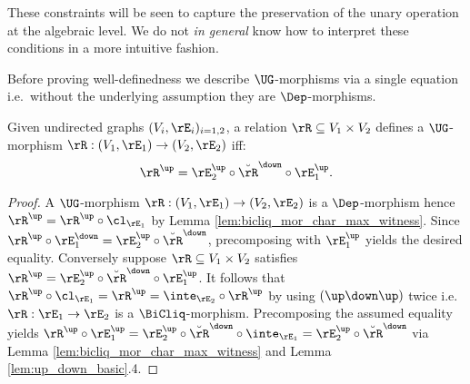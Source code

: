\documentclass{article}
\begin{document}
\smallskip

\begin{note}
These constraints will be seen to capture the preservation of the unary operation at the algebraic level. We do not \emph{in general} know how to interpret these conditions in a more intuitive fashion. \endbox
\end{note}


\smallskip
Before proving well-definedness we describe $\UG$-morphisms via a single equation i.e.\ without the underlying assumption they are $\Dep$-morphisms.

\begin{lemma}
\item
Given undirected graphs $(V_i,\rE_i)_{i = 1,2}$, a relation $\rR \subseteq V_1 \times V_2$ defines a $\UG$-morphism $\rR : (V_1,\rE_1) \to (V_2,\rE_2)$ iff:
\[
\rR^\up = \rE_2^\up \circ \breve{\rR}^\down \circ \rE_1^\up.
\]
\end{lemma}

\begin{proof}
A $\UG$-morphism $\rR : (V_1,\rE_1) \to (V_2,\rE_2)$ is a $\Dep$-morphism hence $\rR^\up = \rR^\up \circ \cl_{\rE_1}$ by Lemma \ref{lem:bicliq_mor_char_max_witness}. Since $\rR^\up \circ \rE_1^\down = \rE_2^\up \circ \breve{\rR}^\down$, precomposing with $\rE_1^\up$ yields the desired equality. Conversely suppose $\rR \subseteq V_1 \times V_2$ satisfies $\rR^\up = \rE_2^\up \circ \breve{\rR}^\down \circ \rE_1^\up$. It follows that $\rR^\up \circ \cl_{\rE_1} = \rR^\up = \inte_{\rE_2} \circ \rR^\up$ by using $(\up\down\up)$ twice i.e.\ $\rR : \rE_1 \to \rE_2$ is a $\BiCliq$-morphism. Precomposing the assumed equality yields $\rR^\up \circ \rE_1^\up = \rE_2^\up \circ \breve{\rR}^\down \circ \inte_{\rE_1} = \rE_2^\up \circ \breve{\rR}^\down$ via Lemma \ref{lem:bicliq_mor_char_max_witness} and Lemma \ref{lem:up_down_basic}.4.
\end{proof}






\smallskip
\end{document}

